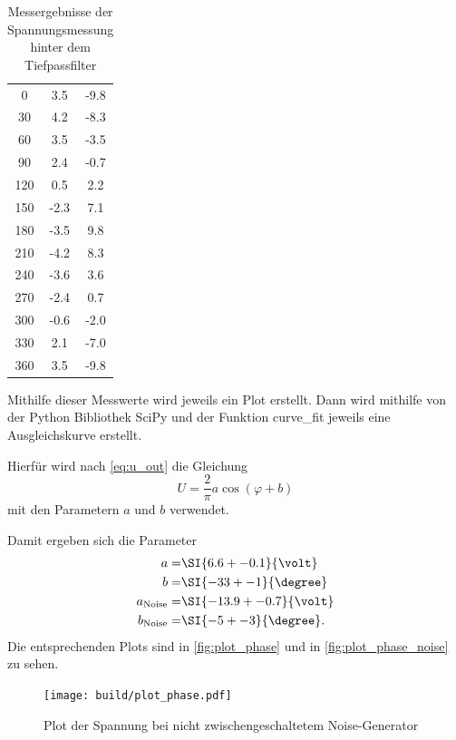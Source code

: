 \begin{table}
    \centering
    \begin{tabular}{S[table-format=3.0] S[table-format=-1.1] S[table-format=-1.1]}
        \toprule
        \tableSI{\varphi}{\degree} &  &  \\
         & 3.5 & -9.8 \\
        30 & 4.2 & -8.3 \\
        60 & 3.5 & -3.5 \\
        90 & 2.4 & -0.7 \\
        120 & 0.5 & 2.2 \\
        150 & -2.3 & 7.1 \\
        180 & -3.5 & 9.8 \\
        210 & -4.2 & 8.3 \\
        240 & -3.6 & 3.6 \\
        270 & -2.4 & 0.7 \\
        300 & -0.6 & -2.0 \\
        330 & 2.1 & -7.0 \\
        360 & 3.5 & -9.8 \\
        \bottomrule
    \end{tabular}
    \caption{Messergebnisse der Spannungsmessung hinter dem Tiefpassfilter}
    \label{tab:phase}
\end{table}

Mithilfe dieser Messwerte wird jeweils ein Plot erstellt.
Dann wird mithilfe von der Python Bibliothek SciPy und der Funktion curve\_fit jeweils eine Ausgleichskurve erstellt.\cite{scipy}

Hierfür wird nach \autoref{eq:u_out} die Gleichung
\begin{equation}
    U = \frac{2}{\pi}  a \cos(\varphi+b)
\end{equation}
mit den Parametern $a$ und $b$ verwendet.

Damit ergeben sich die Parameter
\begin{align*}
    a =& \SI{6.6+-0.1}{\volt} \\
    b =& \SI{-33+-1}{\degree} \\
    a_\text{Noise} =& \SI{-13.9+-0.7}{\volt} \\
    b_\text{Noise} =& \SI{-5+-3}{\degree}.
\end{align*}
Die entsprechenden Plots sind in \autoref{fig:plot_phase} und in \autoref{fig:plot_phase_noise} zu sehen.

\begin{figure}
    \centering
    \texttt{[image: build/plot\_phase.pdf]}
    \caption{Plot der Spannung bei nicht zwischengeschaltetem Noise-Generator}
    \label{fig:plot_phase}
\end{figure}

